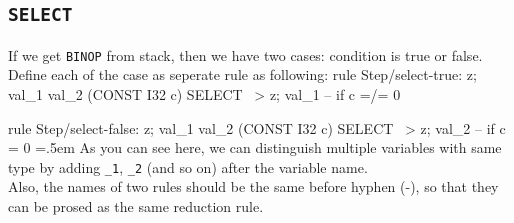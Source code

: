 \documentclass{article}
\newenvironment{lcverbatim}
 {\SaveVerbatim{cverb}}
 {\endSaveVerbatim
  \flushleft\fboxrule=0pt\fboxsep=.5em
  \colorbox{cverbbg}{%
    \makebox[\dimexpr\linewidth-2\fboxsep][l]{\BUseVerbatim{cverb}}%
  }
  \endflushleft
}
\newcommand\K[1]{\texttt{#1}}
\begin{document}
\subsection{\K{SELECT}}
If we get \K{BINOP} from stack, then we have two cases: condition is true or false. \\
Define each of the case as seperate rule as following:
\begin{lcverbatim}
rule Step/select-true:
  z; val_1 val_2 (CONST I32 c) SELECT  ~>  z; val_1
  -- if c =/= 0

rule Step/select-false:
  z; val_1 val_2 (CONST I32 c) SELECT  ~>  z; val_2
  -- if c = 0
\end{lcverbatim}
As you can see here, we can distinguish multiple variables with same type by adding \K{\_1}, \K{\_2} (and so on) after the variable name. \\
Also, the names of two rules should be the same before hyphen (-), so that they can be prosed as the same reduction rule.
\end{document}
